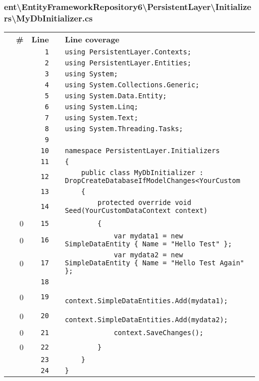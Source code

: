 \documentclass[a4paper,10pt]{article}
\begin{document}
\subsubsection{ent\textbackslash EntityFrameworkRepository6\textbackslash PersistentLayer\textbackslash Initializers\textbackslash MyDbInitializer.cs}
\begin{longtable}[l]{lrrll}
\textbf{} & \textbf{\#} & \textbf{Line} & \textbf{} & \textbf{Line coverage}\\
\cellcolor{gray} &  & \verb~1~ & & \verb~using PersistentLayer.Contexts;~\\
\cellcolor{gray} &  & \verb~2~ & & \verb~using PersistentLayer.Entities;~\\
\cellcolor{gray} &  & \verb~3~ & & \verb~using System;~\\
\cellcolor{gray} &  & \verb~4~ & & \verb~using System.Collections.Generic;~\\
\cellcolor{gray} &  & \verb~5~ & & \verb~using System.Data.Entity;~\\
\cellcolor{gray} &  & \verb~6~ & & \verb~using System.Linq;~\\
\cellcolor{gray} &  & \verb~7~ & & \verb~using System.Text;~\\
\cellcolor{gray} &  & \verb~8~ & & \verb~using System.Threading.Tasks;~\\
\cellcolor{gray} &  & \verb~9~ & & \verb~~\\
\cellcolor{gray} &  & \verb~10~ & & \verb~namespace PersistentLayer.Initializers~\\
\cellcolor{gray} &  & \verb~11~ & & \verb~{~\\
\cellcolor{gray} &  & \verb~12~ & & \verb~    public class MyDbInitializer : DropCreateDatabaseIfModelChanges<YourCustom~\\
\cellcolor{gray} &  & \verb~13~ & & \verb~    {~\\
\cellcolor{gray} &  & \verb~14~ & & \verb~        protected override void Seed(YourCustomDataContext context)~\\
\cellcolor{red} & 0 & \verb~15~ & & \verb~        {~\\
\cellcolor{red} & 0 & \verb~16~ & & \verb~            var mydata1 = new SimpleDataEntity { Name = "Hello Test" };~\\
\cellcolor{red} & 0 & \verb~17~ & & \verb~            var mydata2 = new SimpleDataEntity { Name = "Hello Test Again" };~\\
\cellcolor{gray} &  & \verb~18~ & & \verb~~\\
\cellcolor{red} & 0 & \verb~19~ & & \verb~            context.SimpleDataEntities.Add(mydata1);~\\
\cellcolor{red} & 0 & \verb~20~ & & \verb~            context.SimpleDataEntities.Add(mydata2);~\\
\cellcolor{red} & 0 & \verb~21~ & & \verb~            context.SaveChanges();~\\
\cellcolor{red} & 0 & \verb~22~ & & \verb~        }~\\
\cellcolor{gray} &  & \verb~23~ & & \verb~    }~\\
\cellcolor{gray} &  & \verb~24~ & & \verb~}~\\
\end{longtable}
\newpage
\end{document}
